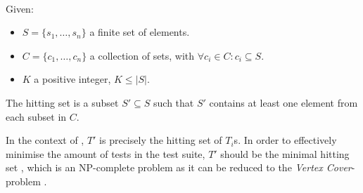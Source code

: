 \begin{definition}
\label{def:hitting-set}
\mbox{}\\Given:
\begin{itemize}
	\item $S = \{s_1, \dots, s_n\}$ a finite set of elements.
	\item $C = \{c_1, \dots, c_n\}$ a collection of sets, with $\forall c_i \in C : c_i \subseteq S$.
	\item $K$ a positive integer, $K \le |S|$.
\end{itemize}

\noindent The hitting set is a subset $S' \subseteq S$ such that $S'$ contains at least one element from each subset in $C$.
\end{definition}

\noindent In the context of \tsm{}, $T'$ is precisely the hitting set of $T_i$s. In order to effectively minimise the amount of tests in the test suite, $T'$ should be the minimal hitting set \cite{10.1002/stv.430}, which is an NP-complete problem as it can be reduced to the \emph{Vertex Cover}-problem \cite{10.5555/574848}.